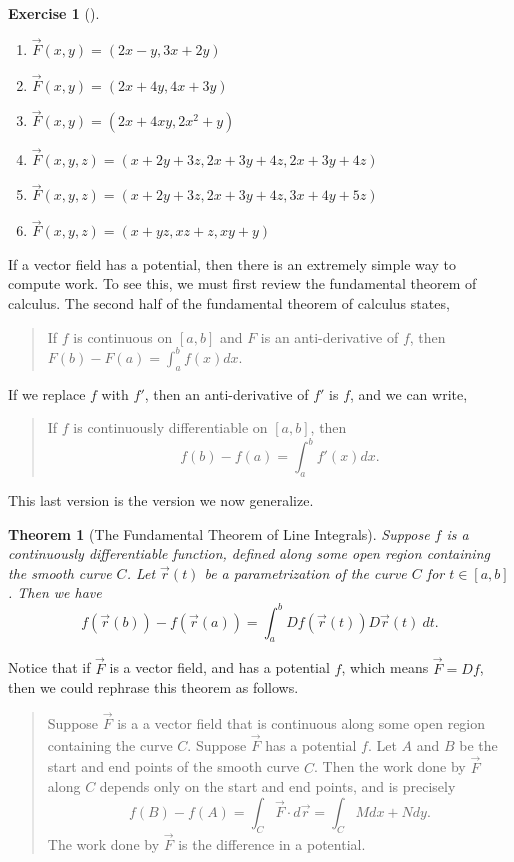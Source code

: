 \documentclass[10pt,]{book}
\theoremstyle{plain}
\newtheorem{theorem}{Theorem}[section]
\theoremstyle{definition}
\theoremstyle{definition}
\theoremstyle{definition}
\theoremstyle{definition}
\newtheorem{exploration}[project]{Exercise}
\theoremstyle{definition}
\numberwithin{equation}{section}
\begin{document}
\begin{exploration}[]\label{exploration-204}
\leavevmode%
\begin{enumerate}[font=\bfseries,label=(\alph*),ref=\alph*]
\item\label{task-524} \(\vec F(x,y)=(2x-y, 3x+2y)\)%
\item\label{task-525} \(\vec F(x,y)=(2x+4y, 4x+3y)\)%
\item\label{task-526} \(\vec F(x,y)=(2x+4xy, 2x^2+y)\)%
\item\label{task-527} \(\vec F(x,y,z)=(x+2y+3z,2x+3y+4z,2x+3y+4z)\)%
\item\label{task-528} \(\vec F(x,y,z)=(x+2y+3z,2x+3y+4z,3x+4y+5z)\)%
\item\label{task-529} \(\vec F(x,y,z)=(x+yz,xz+z,xy+y)\)%
\end{enumerate}
\end{exploration}
If a vector field has a potential, then there is an extremely simple way to compute work. To see this, we must first review the fundamental theorem of calculus. The second half of the fundamental theorem of calculus states,%
\begin{quote}\hypertarget{blockquote-6}{}
If \(f\) is continuous on \([a,b]\) and \(F\) is an anti-derivative of \(f\), then \(F(b)-F(a) = \int_a^b f(x) dx\).\end{quote}
If we replace \(f\) with \(f'\), then an anti-derivative of \(f'\) is \(f\), and we can write,%
\begin{quote}\hypertarget{blockquote-7}{}
If \(f\) is continuously differentiable on \([a,b]\), then%
\begin{equation*}
f(b)-f(a)=\int_a^b f'(x) dx.
\end{equation*}
\end{quote}
This last version is the version we now generalize.%
\begin{theorem}[{The Fundamental Theorem of Line Integrals}]\label{theorem-6}
Suppose \(f\) is a continuously differentiable function, defined along some open region containing the smooth curve \(C\). Let \(\vec r(t)\) be a parametrization of the curve \(C\) for \(t\in[a,b]\). Then we have%
\begin{equation*}
f(\vec r(b))-f(\vec r(a))=\int_a^b Df(\vec r(t))D\vec r(t)\ dt.
\end{equation*}
%
\end{theorem}
Notice that if \(\vec F\) is a vector field, and has a potential \(f\), which means \(\vec F = Df\), then we could rephrase this theorem as follows.%
\begin{quote}\hypertarget{blockquote-8}{}
Suppose \(\vec F\) is a a vector field that is continuous along some open region containing the curve \(C\). Suppose \(\vec F\) has a potential \(f\). Let \(A\) and \(B\) be the start and end points of the smooth curve \(C\).  Then the work done by \(\vec F\) along \(C\) depends only on the start and end points, and is precisely%
\begin{equation*}
f(B)-f(A)=\int_C \vec F\cdot d\vec r = \int_C Mdx+Ndy.
\end{equation*}
The work done by \(\vec F\) is the difference in a potential.\end{quote}
\end{document}
